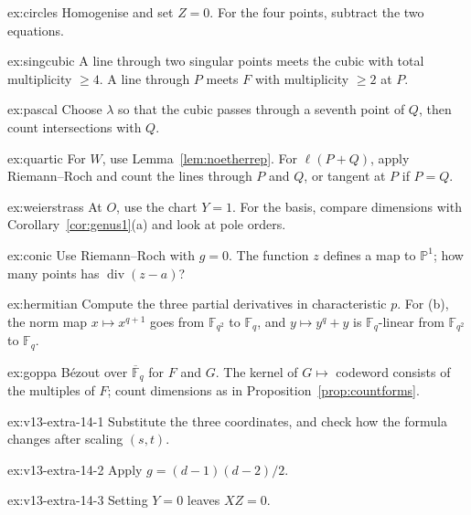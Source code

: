 \begin{hint}{ex:circles}
Homogenise and set $Z=0$. For the four points, subtract the two equations.
\end{hint}
\begin{hint}{ex:singcubic}
A line through two singular points meets the cubic with total multiplicity $\ge4$. A line through $P$ meets $F$ with multiplicity $\ge2$ at $P$.
\end{hint}
\begin{hint}{ex:pascal}
Choose $\lambda$ so that the cubic passes through a seventh point of $Q$, then count intersections with $Q$.
\end{hint}
\begin{hint}{ex:quartic}
For $W$, use Lemma~\ref{lem:noetherrep}. For $\ell(P+Q)$, apply Riemann--Roch and count the lines through $P$ and $Q$, or tangent at $P$ if $P=Q$.
\end{hint}
\begin{hint}{ex:weierstrass}
At $O$, use the chart $Y=1$. For the basis, compare dimensions with Corollary~\ref{cor:genus1}(a) and look at pole orders.
\end{hint}
\begin{hint}{ex:conic}
Use Riemann--Roch with $g=0$. The function $z$ defines a map to $\mathbb P^1$; how many points has $\operatorname{div}(z-a)$?
\end{hint}
\begin{hint}{ex:hermitian}
Compute the three partial derivatives in characteristic $p$. For (b), the norm map $x\mapsto x^{q+1}$ goes from $\mathbb F_{q^2}$ to $\mathbb F_q$, and $y\mapsto
y^q+y$ is $\mathbb F_q$-linear from $\mathbb F_{q^2}$ to $\mathbb F_q$.
\end{hint}
\begin{hint}{ex:goppa}
B\'ezout over $\overline{\mathbb F}_q$ for $F$ and $G$. The kernel of $G\mapsto$ codeword consists of the multiples of $F$; count dimensions as in
Proposition~\ref{prop:countforms}.
\end{hint}

\begin{hint}{ex:v13-extra-14-1}
Substitute the three coordinates, and check how the formula changes after scaling $(s,t)$.
\end{hint}

\begin{hint}{ex:v13-extra-14-2}
Apply $g=(d-1)(d-2)/2$.
\end{hint}

\begin{hint}{ex:v13-extra-14-3}
Setting $Y=0$ leaves $XZ=0$.
\end{hint}

